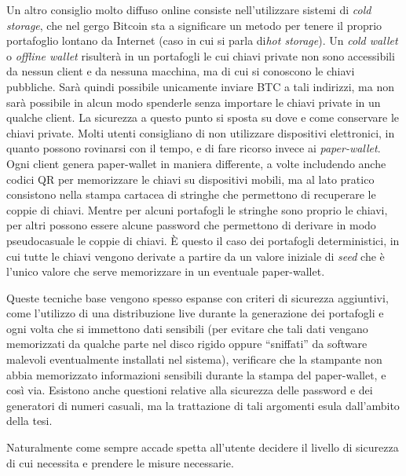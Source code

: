 Un altro consiglio molto diffuso online consiste nell'utilizzare sistemi di \emph{cold storage}, che nel gergo Bitcoin sta a significare un metodo per tenere il proprio portafoglio lontano da Internet (caso in cui si parla di\emph{hot storage}). Un \emph{cold wallet} o \emph{offline wallet} risulterà in un portafogli le cui chiavi private non sono accessibili da nessun client e da nessuna macchina, ma di cui si conoscono le chiavi pubbliche. Sarà quindi possibile unicamente inviare BTC a tali indirizzi, ma non sarà possibile in alcun modo spenderle senza importare le chiavi private in un qualche client.
La sicurezza a questo punto si sposta su dove e come conservare le chiavi private. Molti utenti consigliano di non utilizzare dispositivi elettronici, in quanto possono rovinarsi con il tempo, e di fare ricorso invece ai \emph{paper-wallet}. Ogni client genera paper-wallet in maniera differente, a volte includendo anche codici QR per memorizzare le chiavi su dispositivi mobili, ma al lato pratico consistono nella stampa cartacea di stringhe che permettono di recuperare le coppie di chiavi.
Mentre per alcuni portafogli le stringhe sono proprio le chiavi, per altri possono essere alcune password che permettono di derivare in modo pseudocasuale le coppie di chiavi. È questo il caso dei portafogli deterministici, in cui tutte le chiavi vengono derivate a partire da un valore iniziale di \emph{seed} che è l'unico valore che serve memorizzare in un eventuale paper-wallet.

Queste tecniche base vengono spesso espanse con criteri di sicurezza aggiuntivi, come l'utilizzo di una distribuzione live durante la generazione dei portafogli e ogni volta che si immettono dati sensibili (per evitare che tali dati vengano memorizzati da qualche parte nel disco rigido oppure ``sniffati'' da software malevoli eventualmente installati nel sistema), verificare che la stampante non abbia memorizzato informazioni sensibili durante la stampa del paper-wallet, e così via.
Esistono anche questioni relative alla sicurezza delle password e dei generatori di numeri casuali, ma la trattazione di tali argomenti esula dall'ambito della tesi.

Naturalmente come sempre accade spetta all'utente decidere il livello di sicurezza di cui necessita e prendere le misure necessarie.

